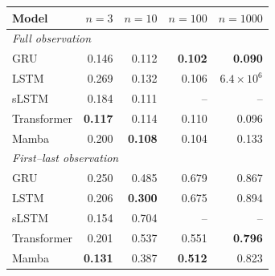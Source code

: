 \begin{tabular}{lrrrr}
\toprule
Model & $n{=}3$ & $n{=}10$ & $n{=}100$ & $n{=}1000$ \\
\midrule
\multicolumn{5}{l}{\emph{Full observation}} \\
GRU & 0.146 & 0.112 & \textbf{0.102} & \textbf{0.090} \\
LSTM & 0.269 & 0.132 & 0.106 & $6.4\!\times\!10^{6}$ \\
sLSTM & 0.184 & 0.111 & -- & -- \\
Transformer & \textbf{0.117} & 0.114 & 0.110 & 0.096 \\
Mamba & 0.200 & \textbf{0.108} & 0.104 & 0.133 \\
\midrule
\multicolumn{5}{l}{\emph{First--last observation}} \\
GRU & 0.250 & 0.485 & 0.679 & 0.867 \\
LSTM & 0.206 & \textbf{0.300} & 0.675 & 0.894 \\
sLSTM & 0.154 & 0.704 & -- & -- \\
Transformer & 0.201 & 0.537 & 0.551 & \textbf{0.796} \\
Mamba & \textbf{0.131} & 0.387 & \textbf{0.512} & 0.823 \\
\bottomrule
\end{tabular}
